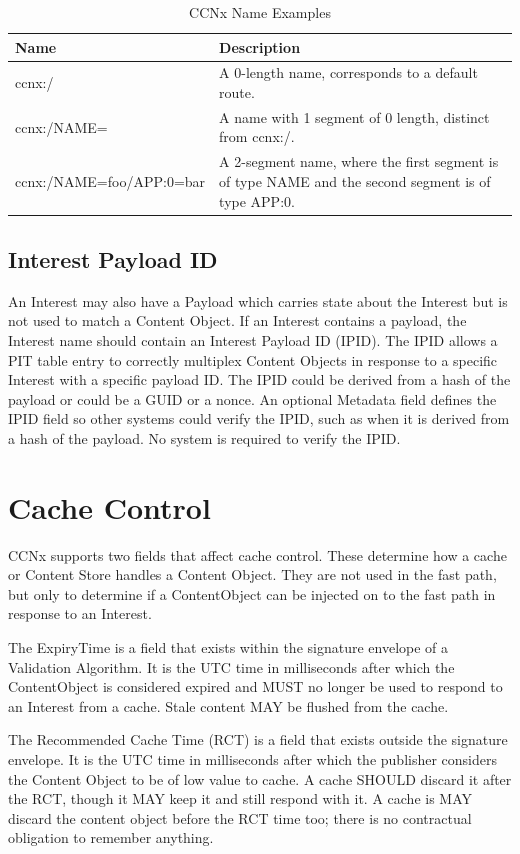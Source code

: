 \documentclass[12pt]{article}
\begin{document}
\begin{table}[t!]
\center
\caption{CCNx Name Examples}
\begin{tabular}{|p{5cm}|p{9cm}|} \hline
{\bf Name} & {\bf Description} \\ \hline
ccnx:/ & A 0-length name, corresponds to a default route. \\
ccnx:/NAME= & A name with 1 segment of 0 length, distinct from ccnx:/. \\
ccnx:/NAME=foo/APP:0=bar & A 2-segment name, where the first segment is of type NAME and the second segment is of type APP:0. \\ \hline
\end{tabular}
\label{tab:names}
\end{table}

\subsection{Interest Payload ID}
An Interest may also have a Payload which carries state about the
Interest but is not used to match a Content Object.  If an Interest
contains a payload, the Interest name should contain an Interest
Payload ID (IPID).  The IPID allows a PIT table entry to correctly
multiplex Content Objects in response to a specific Interest with a
specific payload ID.  The IPID could be derived from a hash of the
payload or could be a GUID or a nonce.  An optional Metadata field
defines the IPID field so other systems could verify the IPID, such
as when it is derived from a hash of the payload.  No system is
required to verify the IPID.

\section{Cache Control}
CCNx supports two fields that affect cache control.  These determine
how a cache or Content Store handles a Content Object.  They are not
used in the fast path, but only to determine if a ContentObject can
be injected on to the fast path in response to an Interest.

The ExpiryTime is a field that exists within the signature envelope
of a Validation Algorithm.  It is the UTC time in milliseconds after
which the ContentObject is considered expired and MUST no longer be
used to respond to an Interest from a cache.  Stale content MAY be
flushed from the cache.

The Recommended Cache Time (RCT) is a field that exists outside the
signature envelope.  It is the UTC time in milliseconds after which
the publisher considers the Content Object to be of low value to
cache.  A cache SHOULD discard it after the RCT, though it MAY keep
it and still respond with it.  A cache is MAY discard the content
object before the RCT time too; there is no contractual obligation to
remember anything.
\end{document}
